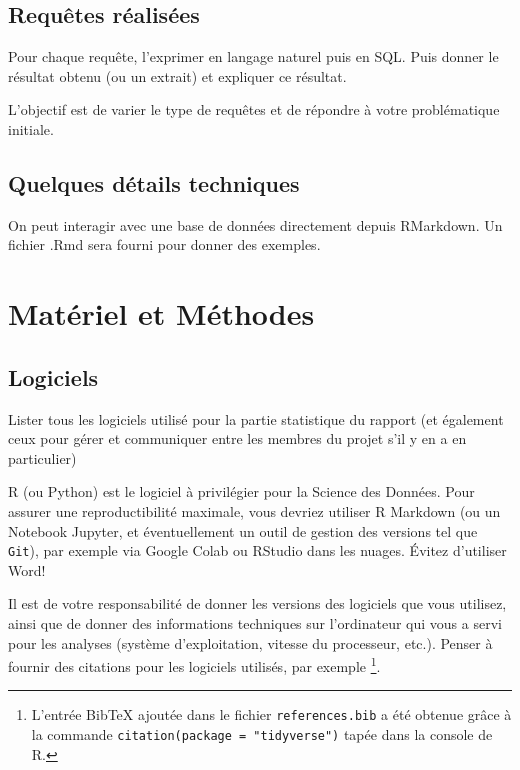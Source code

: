 \documentclass[mstat,12pt]{unswthesis}
\begin{document}
\section{Requêtes réalisées}\label{requuxeates-ruxe9alisuxe9es}

Pour chaque requête, l'exprimer en langage naturel puis en SQL. Puis
donner le résultat obtenu (ou un extrait) et expliquer ce résultat.

L'objectif est de varier le type de requêtes et de répondre à votre
problématique initiale.

\section{Quelques détails
techniques}\label{quelques-duxe9tails-techniques}

On peut interagir avec une base de données directement depuis RMarkdown.
Un fichier .Rmd sera fourni pour donner des exemples.

\chapter{Matériel et Méthodes}\label{matuxe9riel-et-muxe9thodes}

\section{Logiciels}\label{logiciels}

Lister tous les logiciels utilisé pour la partie statistique du rapport
(et également ceux pour gérer et communiquer entre les membres du projet
s'il y en a en particulier)

\medskip

R (ou Python) est le logiciel à privilégier pour la Science des Données.
Pour assurer une reproductibilité maximale, vous devriez utiliser R
Markdown (ou un Notebook Jupyter, et éventuellement un outil de gestion
des versions tel que \texttt{Git}), par exemple via Google Colab ou
RStudio dans les nuages. Évitez d'utiliser Word!

\bigskip

Il est de votre responsabilité de donner les versions des logiciels que
vous utilisez, ainsi que de donner des informations techniques sur
l'ordinateur qui vous a servi pour les analyses (système d'exploitation,
vitesse du processeur, etc.). Penser à fournir des citations pour les
logiciels utilisés, par exemple
\footnote{L'entrée BibTeX ajoutée dans le fichier \texttt{references.bib} a été obtenue grâce à la commande  \texttt{citation(package = "tidyverse")} tapée dans la console de R.}.
\end{document}
